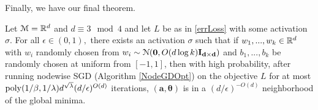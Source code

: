 Finally, we have our final theorem.

\begin{theorem}\label{nodewiseSGD}
Let $\mathcal{M} = {\mathbb{R}}^{d}$ and $d \equiv 3 \mod 4$ and let $L$ be as in \ref{errLoss} with some activation $\sigma$. For all $\epsilon \in (0,1),$ there exists an activation $\sigma$ such that if $w_1,...,w_k \in {\mathbb{R}}^d$ with $w_i$ randomly chosen from $w_i \sim  \mathcal{N}({\bf 0}, O(d\log k){\bf I_{d\times d}})$ and $b_1,...,b_k$ be randomly chosen at uniform from $[-1,1]$, then with high probability, after running nodewise SGD (Algorithm \ref{NodeGDOpt}) on the objective $L$ for at most $\mathrm{poly}(1/\beta,1/\lambda)d^{\sqrt{\lambda}}(d/\epsilon)^{O(d)}$ iterations, $\boldsymbol{(a,\theta)}$ is in a $(d/\epsilon)^{-O(d)}$ neighborhood of the global minima.
\end{theorem}

